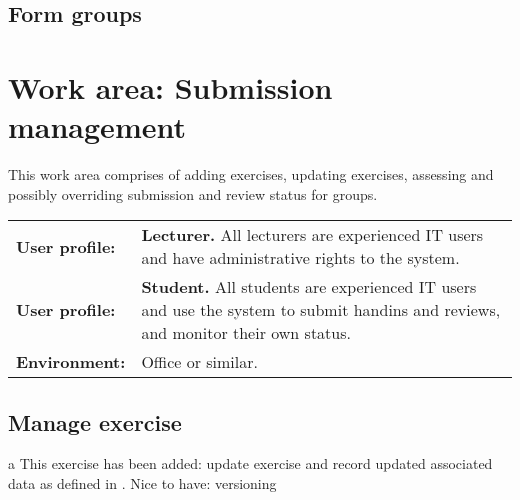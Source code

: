 \documentclass[Main]{subfiles}
\begin{document}
\subsection{Form groups} \label{sec:FormGroups}

\begin{DataIntro}
\end{DataIntro}

\begin{TaskTable}
\end{TaskTable}

\section{Work area: Submission management}
This work area comprises of adding exercises, updating exercises, assessing and possibly overriding submission and review status for groups.

\begin{tabular}{l  p{13cm}}
 \textbf{User profile:} & \textbf{Lecturer.} All lecturers are experienced IT users and have administrative rights to the system. \\
 \textbf{User profile:} & \textbf{Student.} All students are experienced IT users and use the system to submit handins and reviews, and monitor their own status.  \\
 \textbf{Environment:} & Office or similar.
\end{tabular}

\subsection{Manage exercise} \label{sec:ManageExercise}

\begin{DataIntro}
\end{DataIntro}

\begin{TaskTable}
\RecordAddi
{a}
{This exercise has been added: update exercise and record updated associated data as defined in . }{Nice to have: versioning}{}

\end{TaskTable}
\end{document}

